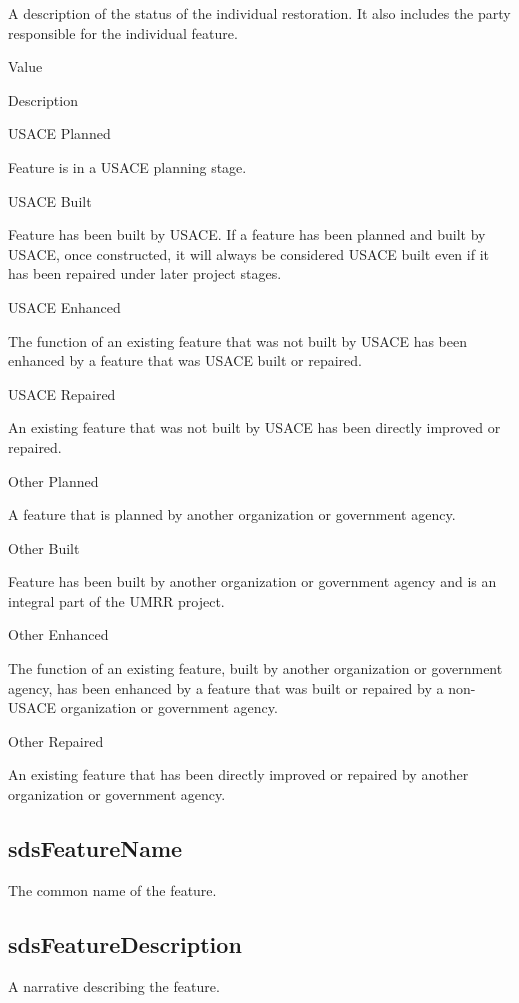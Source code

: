\documentclass[
  letterpaper,
  DIV=11,
  numbers=noendperiod]{scrreprt}
\begin{document}
A description of the status of the individual restoration. It also
includes the party responsible for the individual feature.

Value

Description

USACE Planned

Feature is in a USACE planning stage.

USACE Built

Feature has been built by USACE. If a feature has been planned and built
by USACE, once constructed, it will always be considered USACE built
even if it has been repaired under later project stages.

USACE Enhanced

The function of an existing feature that was not built by USACE has been
enhanced by a feature that was USACE built or repaired.

USACE Repaired

An existing feature that was not built by USACE has been directly
improved or repaired.

Other Planned

A feature that is planned by another organization or government agency.

Other Built

Feature has been built by another organization or government agency and
is an integral part of the UMRR project.

Other Enhanced

The function of an existing feature, built by another organization or
government agency, has been enhanced by a feature that was built or
repaired by a non-USACE organization or government agency.

Other Repaired

An existing feature that has been directly improved or repaired by
another organization or government agency.

\subsection{sdsFeatureName}\label{sdsfeaturename-7}

The common name of the feature.

\subsection{sdsFeatureDescription}\label{sdsfeaturedescription-7}

A narrative describing the feature.
\end{document}
